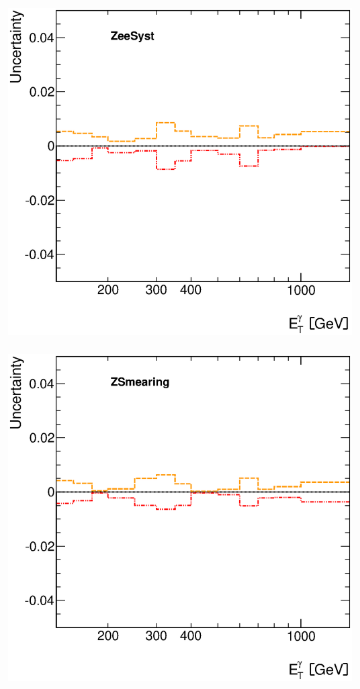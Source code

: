 \documentclass[12pt, twoside]{article}
\numberwithin{equation}{section}
\numberwithin{figure}{section}
\newenvironment{changemargin}[2]{%
\begin{list}{}{%
\setlength{\topsep}{0pt}%
\setlength{\leftmargin}{#1}%
\setlength{\rightmargin}{#2}%
\setlength{\listparindent}{\parindent}%
\setlength{\itemindent}{\parindent}%
\setlength{\parsep}{\parskip}%
}%
\item[]}{\end{list}}
\begin{document}
\begin{figure}
\begin{changemargin}{-1.0cm}{-0.75cm}
\begin{changemargin}{-0.75cm}{-1.0cm}
\begin{subfigure}[b]{0.27\textwidth}
        \end{subfigure}
        \begin{subfigure}[b]{0.27\textwidth}
            \includegraphics[width=\textwidth]{./images/PhotonSystematics/PhotonSystematic-26.eps}
        \end{subfigure}
        \begin{subfigure}[b]{0.27\textwidth}
            \includegraphics[width=\textwidth]{./images/PhotonSystematics/PhotonSystematic-27.eps}
        \end{subfigure}
    \end{changemargin}


\end{changemargin}
\end{figure}
\end{document}
